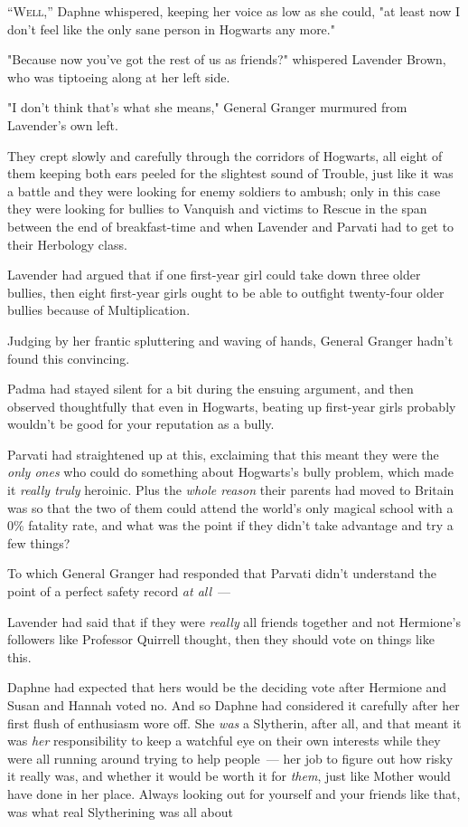 
\lettrine{“W}{ell,''} Daphne
whispered, keeping her voice as low as she could, "at least now I don't feel
like the only sane person in Hogwarts any more."

"Because now you've got the rest of us as friends?" whispered Lavender Brown,
who was tiptoeing along at her left side.

"I don't think that's what she means," General Granger murmured from Lavender's
own left.

They crept slowly and carefully through the corridors of Hogwarts, all eight of
them keeping both ears peeled for the slightest sound of Trouble, just like it
was a battle and they were looking for enemy soldiers to ambush; only in this
case they were looking for bullies to Vanquish and victims to Rescue in the
span between the end of breakfast-time and when Lavender and Parvati had to get
to their Herbology class.

Lavender had argued that if one first-year girl could take down three older
bullies, then eight first-year girls ought to be able to outfight twenty-four
older bullies because of Multiplication.

Judging by her frantic spluttering and waving of hands, General Granger hadn't
found this convincing.

Padma had stayed silent for a bit during the ensuing argument, and then
observed thoughtfully that even in Hogwarts, beating up first-year girls
probably wouldn't be good for your reputation as a bully.

Parvati had straightened up at this, exclaiming that this meant they were the
\emph{only ones} who could do something about Hogwarts's bully problem, which
made it \emph{really truly} heroinic. Plus the \emph{whole reason} their
parents had moved to Britain was so that the two of them could attend the
world's only magical school with a 0\% fatality rate, and what was the point if
they didn't take advantage and try a few things?

To which General Granger had responded that Parvati didn't understand the point
of a perfect safety record \emph{at all}~---

Lavender had said that if they were \emph{really} all friends together and not
Hermione's followers like Professor Quirrell thought, then they should vote on
things like this.

Daphne had expected that hers would be the deciding vote after Hermione and
Susan and Hannah voted no. And so Daphne had considered it carefully after her
first flush of enthusiasm wore off. She \emph{was} a Slytherin, after all, and
that meant it was \emph{her} responsibility to keep a watchful eye on their own
interests while they were all running around trying to help people~--- her job to
figure out how risky it really was, and whether it would be worth it for
\emph{them}, just like Mother would have done in her place. Always looking out
for yourself and your friends like that, was what real Slytherining was all
about{\el}

